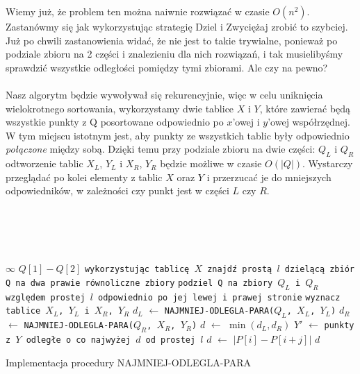 Wiemy już, że problem ten można naiwnie rozwiązać w czasie $O(n^2)$.
Zastanówmy się jak wykorzystując strategię Dziel i Zwyciężaj zrobić to szybciej.
Już po chwili zastanowienia widać, że nie jest to takie trywialne, ponieważ po podziale zbioru na 2 części i znalezieniu dla nich rozwiązań, i tak musielibyśmy sprawdzić wszystkie odległości pomiędzy tymi zbiorami. 
Ale czy na pewno?
\\\\
Nasz algorytm będzie wywoływał się rekurencyjnie, więc w celu uniknięcia wielokrotnego sortowania, wykorzystamy dwie tablice $X$ i $Y$, które zawierać będą wszystkie punkty z Q posortowane odpowiednio po $x$'owej i $y$'owej współrzędnej.  
W tym miejscu istotnym jest, aby punkty ze wszystkich tablic były odpowiednio \textit{połączone} między sobą.  
Dzięki temu przy podziale zbioru na dwie części: $Q_L$ i $Q_R$ odtworzenie tablic $X_L$, $Y_L$ i $X_R$, $Y_R$ będzie możliwe w czasie $O(|Q|)$.  
Wystarczy przeglądać po kolei elementy z tablic $X$ oraz $Y$ i przerzucać je do mniejszych odpowiedników, w zależności czy punkt jest w części $L$ czy $R$.
\\\\
\begin{algorithm}[H]
 	\DontPrintSemicolon
  	\\
  	\\
  	\\
    	  { \Return $\infty$ }
         {\Return $Q[1] - Q[2]$}
		\texttt{wykorzystując tablicę $X$ znajdź prostą $l$ dzielącą zbiór Q na dwa prawie równoliczne zbiory}\;
		\texttt{podziel Q na zbiory $Q_L$ i $Q_R$ względem prostej $l$ odpowiednio po jej lewej i prawej stronie}\;
        \texttt{wyznacz tablice $X_L$, $Y_L$ i $X_R$, $Y_R$}\;
        $d_L$ $\leftarrow$ \texttt{NAJMNIEJ-ODLEGLA-PARA($Q_L$, $X_L$, $Y_L$)}\;
        $d_R$ $\leftarrow$ \texttt{NAJMNIEJ-ODLEGLA-PARA($Q_R$, $X_R$, $Y_R$)}\;
         $d$ $\leftarrow$ $\min{(d_L, d_R)}$\;
         $Y'$ $\leftarrow$ \texttt{punkty z $Y$ odległe o co najwyżej $d$ od prostej $l$}\;
          {
         	 {
            	 {
                	$d$ $\leftarrow$ $|P[i] - P[i+j]|$
                }
            }
         }
        \Return $d$
  	\caption{Implementacja procedury NAJMNIEJ-ODLEGLA-PARA}
\end{algorithm}
